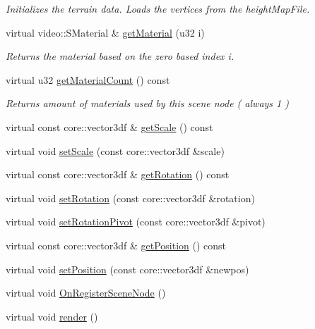 \begin{DoxyCompactItemize}
\begin{DoxyCompactList}\small\item\em Initializes the terrain data. Loads the vertices from the height\-Map\-File. \end{DoxyCompactList}\item 
virtual video\-::\-S\-Material \& \hyperlink{classirr_1_1scene_1_1_c_terrain_scene_node_aac2cd795bd791d460df82f065304c6fc}{get\-Material} (u32 i)
\begin{DoxyCompactList}\small\item\em Returns the material based on the zero based index i. \end{DoxyCompactList}\item 
virtual u32 \hyperlink{classirr_1_1scene_1_1_c_terrain_scene_node_a71e48b82cf8acff480287d65807bf13d}{get\-Material\-Count} () const 
\begin{DoxyCompactList}\small\item\em Returns amount of materials used by this scene node ( always 1 ) \end{DoxyCompactList}\item 
virtual const core\-::vector3df \& \hyperlink{classirr_1_1scene_1_1_c_terrain_scene_node_a17b77af71ad0e9b35ca21f167a7e9e27}{get\-Scale} () const 
\item 
virtual void \hyperlink{classirr_1_1scene_1_1_c_terrain_scene_node_a7017656346664116a78f207acb21c1b9}{set\-Scale} (const core\-::vector3df \&scale)
\item 
virtual const core\-::vector3df \& \hyperlink{classirr_1_1scene_1_1_c_terrain_scene_node_a199ac8ad782803c658401141e8b9d420}{get\-Rotation} () const 
\item 
virtual void \hyperlink{classirr_1_1scene_1_1_c_terrain_scene_node_afb8017fda081bc31eec1c810c4c7f796}{set\-Rotation} (const core\-::vector3df \&rotation)
\item 
virtual void \hyperlink{classirr_1_1scene_1_1_c_terrain_scene_node_a746868fc885ea23e38784ce8a2740489}{set\-Rotation\-Pivot} (const core\-::vector3df \&pivot)
\item 
virtual const core\-::vector3df \& \hyperlink{classirr_1_1scene_1_1_c_terrain_scene_node_aeaa67deffa97589163afa11d75faec35}{get\-Position} () const 
\item 
virtual void \hyperlink{classirr_1_1scene_1_1_c_terrain_scene_node_aeb6d8f5609b98e9f269ccffd74178d75}{set\-Position} (const core\-::vector3df \&newpos)
\item 
virtual void \hyperlink{classirr_1_1scene_1_1_c_terrain_scene_node_acf84ba8a40e35d94f7137a68c1acb9fb}{On\-Register\-Scene\-Node} ()
\item 
\hypertarget{classirr_1_1scene_1_1_c_terrain_scene_node_aae80a172a06889273adadd13b6aa64ad}{virtual void \hyperlink{classirr_1_1scene_1_1_c_terrain_scene_node_aae80a172a06889273adadd13b6aa64ad}{render} ()}\label{classirr_1_1scene_1_1_c_terrain_scene_node_aae80a172a06889273adadd13b6aa64ad}


\end{DoxyCompactItemize}

